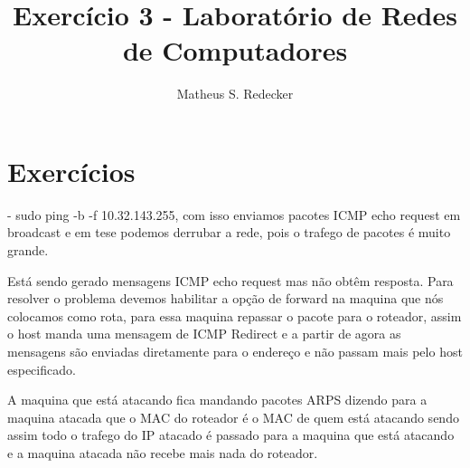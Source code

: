 \documentclass[12pt]{article}
\title{Exercício 3 - Laboratório de Redes de Computadores}
\author{Matheus S. Redecker\inst{1}}
\begin{document}
 

\maketitle

\section{Exercícios}
-
     sudo ping -b -f 10.32.143.255, com isso enviamos pacotes ICMP echo request em broadcast e em tese podemos derrubar a rede, pois o trafego de pacotes é muito grande. 
    
     Está sendo gerado mensagens ICMP echo request mas não obtêm resposta. Para resolver o problema devemos habilitar a opção de forward na maquina que nós colocamos como rota, para essa maquina repassar o pacote para o roteador, assim o host manda uma mensagem de ICMP Redirect e a partir de agora as mensagens são enviadas diretamente para o endereço e não passam mais pelo host especificado. 
    
     A maquina que está atacando fica mandando pacotes ARPS dizendo para a maquina atacada que o MAC do roteador é o MAC de quem está atacando sendo assim todo o trafego do IP atacado é passado para a maquina que está atacando e a maquina atacada não recebe mais nada do roteador. 
\end{document}
